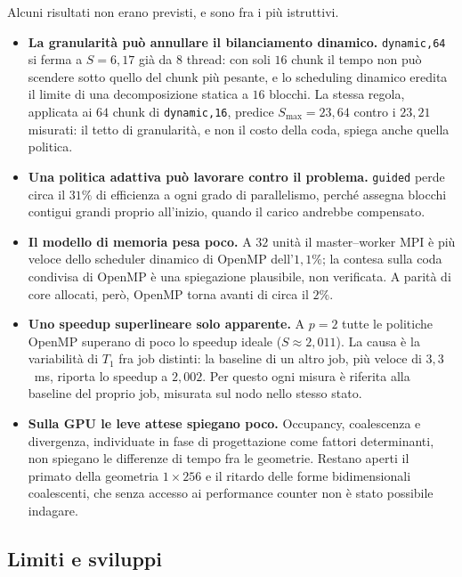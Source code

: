 Alcuni risultati non erano previsti, e sono fra i più istruttivi.
\begin{itemize}
    \item \textbf{La granularità può annullare il bilanciamento dinamico.}
    \texttt{dynamic,64} si ferma a $S = 6{,}17$ già da $8$ thread: con soli $16$
    chunk il tempo non può scendere sotto quello del chunk più pesante, e lo
    scheduling dinamico eredita il limite di una decomposizione statica a $16$
    blocchi. La stessa regola, applicata ai $64$ chunk di \texttt{dynamic,16},
    predice $S_{\max} = 23{,}64$ contro i $23{,}21$ misurati: il tetto di
    granularità, e non il costo della coda, spiega anche quella politica.
    \item \textbf{Una politica adattiva può lavorare contro il problema.}
    \texttt{guided} perde circa il $31\%$ di efficienza a ogni grado di
    parallelismo, perché assegna blocchi contigui grandi proprio all'inizio,
    quando il carico andrebbe compensato.
    \item \textbf{Il modello di memoria pesa poco.} A $32$ unità il master--worker
    MPI è più veloce dello scheduler dinamico di OpenMP dell'$1{,}1\%$; la contesa
    sulla coda condivisa di OpenMP è una spiegazione plausibile, non verificata.
    A parità di core allocati, però, OpenMP torna avanti di circa il $2\%$.
    \item \textbf{Uno speedup superlineare solo apparente.} A $p = 2$ tutte le
    politiche OpenMP superano di poco lo speedup ideale ($S \approx 2{,}011$). La
    causa è la variabilità di $T_1$ fra job distinti: la baseline di un altro job,
    più veloce di $3{,}3$~ms, riporta lo speedup a $2{,}002$. Per questo ogni
    misura è riferita alla baseline del proprio job, misurata sul nodo nello
    stesso stato.
    \item \textbf{Sulla GPU le leve attese spiegano poco.} Occupancy, coalescenza
    e divergenza, individuate in fase di progettazione come fattori determinanti,
    non spiegano le differenze di tempo fra le geometrie. Restano aperti il
    primato della geometria $1{\times}256$ e il ritardo delle forme
    bidimensionali coalescenti, che senza accesso ai performance counter non è
    stato possibile indagare.
\end{itemize}

\subsection{Limiti e sviluppi}

